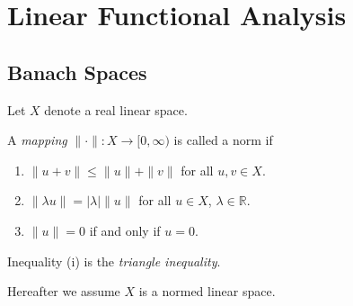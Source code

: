 %

\section{Linear Functional Analysis}
\label{sec:linear-functional-analysis}

\subsection{Banach Spaces}
\label{sec:banach-spaces}

Let $X$ denote a real linear space.

\begin{definition}[Norm]
\label{def:norm-normed-linear-space}
A \textit{mapping} $\|\cdot\| : X \to [0, \infty)$ is called a norm if
\begin{enumerate}
\item[(i)] $\|u + v\| \leq \|u\| + \|v\|$ for all $u, v \in X$.
\item[(ii)] $\|\lambda u\| = |\lambda| \|u\|$ for all $u \in X$, $\lambda \in \mathbb{R}$.
\item[(iii)] $\|u\| = 0$ if and only if $u = 0$.
\end{enumerate}
Inequality (i) is the \textit{triangle inequality}.
\end{definition}

Hereafter we assume $X$ is a normed linear space.

